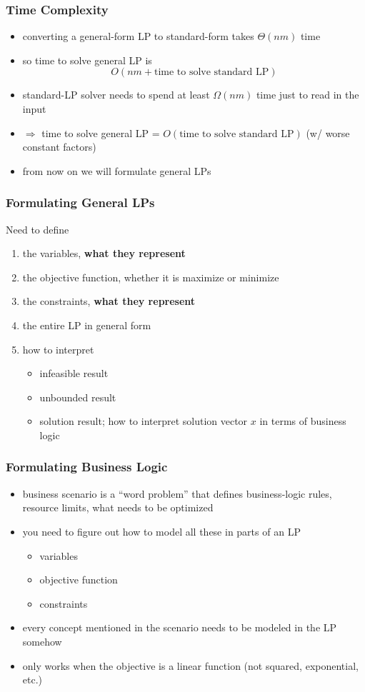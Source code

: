 \documentclass{beamer}
\begin{document}
\begin{frame} \frametitle{Time Complexity}
  \begin{itemize}
    \item converting a general-form LP to standard-form takes $\Theta(nm)$
    time
    \item so time to solve general LP is
    \[ O(nm + \text{time to solve standard LP}) \]
    \item standard-LP solver needs to spend at least $\Omega(nm)$ time
      just to read in the input
    \item $\Rightarrow$ time to solve general LP = $O(\text{time to solve standard LP})$
    (w/ worse constant factors)
    \item from now on we will formulate general LPs
  \end{itemize}
\end{frame}

\begin{frame} \frametitle{Formulating General LPs}
  Need to define
  \begin{enumerate}
    \item the variables, \textbf{what they represent}
    \item the objective function, whether it is maximize or minimize
    \item the constraints, \textbf{what they represent}
    \item the entire LP in general form
    \item how to interpret
    \begin{itemize}
      \item infeasible result
      \item unbounded result
      \item solution result; how to interpret solution vector $x$ in
        terms of business logic
    \end{itemize}
  \end{enumerate}
\end{frame}

\begin{frame} \frametitle{Formulating Business Logic}
  \begin{itemize}
    \item business scenario is a ``word problem'' that defines business-logic
      rules, resource limits, what needs to be optimized
    \item you need to figure out how to model all these in parts of an LP
    \begin{itemize}
      \item variables
      \item objective function
      \item constraints
    \end{itemize}
    \item every concept mentioned in the scenario needs to be modeled in the LP somehow
    \item only works when the objective is a linear function (not squared, exponential, etc.)
  \end{itemize}
\end{frame}
\end{document}
